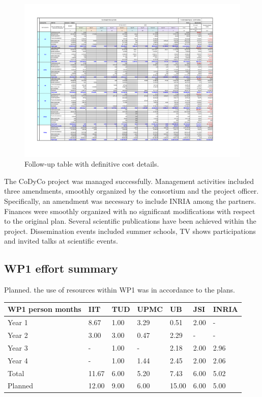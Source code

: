 \documentclass[12pt,a4paper,twoside]{article}
\begin{document}
\begin{figure}
\centering
\includegraphics[width=\textwidth]{images/followup_table.pdf}
\caption{Follow-up table with definitive cost details.}
\end{figure}
 
The CoDyCo project was managed successfully. Management activities included three amendments, smoothly organized by the consortium and the project officer. Specifically, an amendment was necessary to include INRIA among the partners. Finances were smoothly organized with no significant modifications with respect to the original plan. Several scientific publications have been achieved within the project. Dissemination events included summer schools, TV shows participations and invited talks at scientific events.

\subsection{WP1 effort summary}
Planned. the use of resources within WP1 was in accordance to the plans. 

\begin{center}
  \begin{tabular}{|C{1.5cm}|C{1.5cm}|C{1.5cm}|C{2cm}|C{2cm}|C{2cm}|C{2cm}|}
    \hline \footnotesize \textbf{WP1 person months}& \footnotesize
    \textbf{IIT}&\footnotesize \textbf{TUD}&\footnotesize \textbf{UPMC}&
    \footnotesize \textbf{UB} &\footnotesize \textbf{JSI} & \footnotesize \textbf{INRIA}\\
    \hline \footnotesize Year 1  & 8.67  & 1.00 & 3.29 & 0.51 & 2.00 & -\\
    \hline \footnotesize Year 2  & 3.00  & 3.00 & 0.47 & 2.29 & -    & - \\
    \hline \footnotesize Year 3  & -     & 1.00 & -    & 2.18 & 2.00 & 2.96 \\
    \hline \footnotesize Year 4  & -     &  1.00 &  1.44 &  2.45  &  2.00  &  2.06 \\ \hline 
    \footnotesize Total & 11.67 &  6.00 &  5.20 &  7.43 &  6.00 &  5.02    \\  \hline
    \hline \footnotesize Planned & 12.00 & 9.00 & 6.00 & 15.00 & 6.00 & 5.00 \\
    \hline
  \end{tabular}
\end{center}
\end{document}

